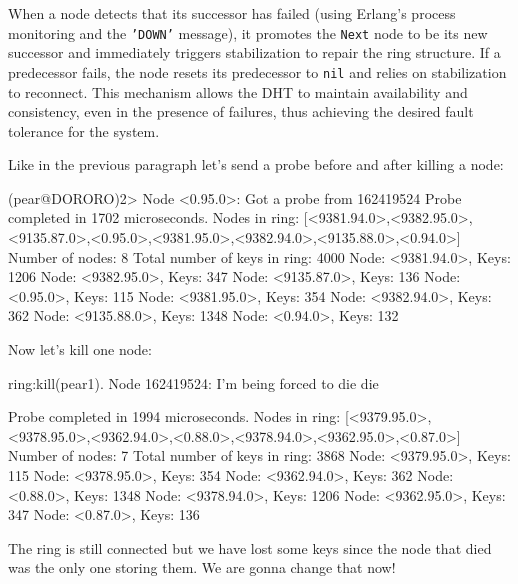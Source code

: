 \documentclass[a4paper, 11pt]{article}
\begin{document}
When a node detects that its successor has failed (using Erlang's process monitoring and the \texttt{'DOWN'} message), it promotes the \texttt{Next} node to be its new successor and immediately triggers stabilization to repair the ring structure. If a predecessor fails, the node resets its predecessor to \texttt{nil} and relies on stabilization to reconnect. This mechanism allows the DHT to maintain availability and consistency, even in the presence of failures, thus achieving the desired fault tolerance for the system.

Like in the previous paragraph let's send a probe before and after killing a node:

\begin{mylisting}
(pear@DORORO)2> Node <0.95.0>: Got a probe from 162419524
Probe completed in 1702 microseconds. Nodes in ring: [<9381.94.0>,<9382.95.0>,<9135.87.0>,<0.95.0>,<9381.95.0>,<9382.94.0>,<9135.88.0>,<0.94.0>]
Number of nodes: 8
Total number of keys in ring: 4000
Node: <9381.94.0>, Keys: 1206
Node: <9382.95.0>, Keys: 347
Node: <9135.87.0>, Keys: 136
Node: <0.95.0>, Keys: 115
Node: <9381.95.0>, Keys: 354
Node: <9382.94.0>, Keys: 362
Node: <9135.88.0>, Keys: 1348
Node: <0.94.0>, Keys: 132

\end{mylisting}

Now let's kill one node:

\begin{mylisting}
ring:kill(pear1).
Node 162419524: I'm being forced to die
die
\end{mylisting}

\begin{mylisting}
Probe completed in 1994 microseconds. Nodes in ring: [<9379.95.0>,<9378.95.0>,<9362.94.0>,<0.88.0>,<9378.94.0>,<9362.95.0>,<0.87.0>]
Number of nodes: 7
Total number of keys in ring: 3868
Node: <9379.95.0>, Keys: 115
Node: <9378.95.0>, Keys: 354
Node: <9362.94.0>, Keys: 362
Node: <0.88.0>, Keys: 1348
Node: <9378.94.0>, Keys: 1206
Node: <9362.95.0>, Keys: 347
Node: <0.87.0>, Keys: 136
\end{mylisting}

The ring is still connected but we have lost some keys since the node that died was the only one storing them. We are gonna change that now!
\end{document}
